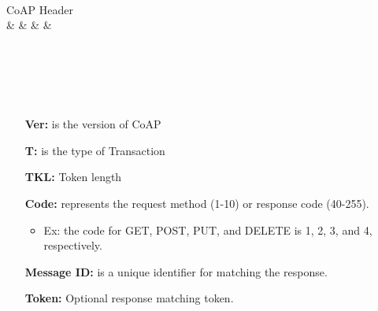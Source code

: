 \begin{bytefield}[bitwidth=1em]{32}
	                                                     \\
	\begin{rightwordgroup}{CoAP Header}                                  \\
	 &  &  &  & \\
	                                                        \\
	                                                      \\
	                                       \\
	\end{rightwordgroup}                                                 \\
\end{bytefield}
\begin{itemize}
	\item[\textbf{Ver:}] is the version of CoAP
	\item[\textbf{T:}] is the type of Transaction
	\item[\textbf{TKL:}] Token length
	\item[\textbf{Code:}] represents the request method (1-10) or response code (40-255).
		\begin{itemize}
			\item Ex: the code for GET, POST, PUT, and DELETE is 1, 2, 3, and 4, respectively.
		\end{itemize}
	\item[\textbf{Message ID:}] is a unique identifier for matching the response.
	\item[\textbf{Token:}] Optional response matching token.
\end{itemize}
	
